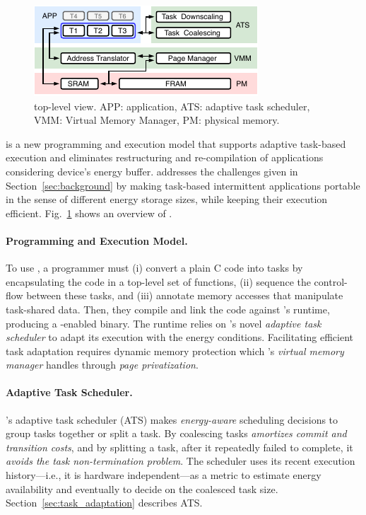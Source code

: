 \begin{figure}
	\centering
	\includegraphics[width=\columnwidth]{figures/system-overview.pdf}
	\caption{\sys top-level view. APP: application, ATS: adaptive task scheduler, VMM: Virtual Memory Manager, PM: physical memory.}
	\label{fig:system_overview}
\end{figure}

\sys is a new programming and execution model that supports adaptive task-based execution and eliminates restructuring and re-compilation of applications considering device's energy buffer. \sys addresses the challenges given in Section~\ref{sec:background} by making task-based intermittent applications portable in the sense of different energy storage sizes, while keeping their execution efficient. Fig.~\ref{fig:system_overview} shows an overview of \sys.

\paragraph{Programming and Execution Model.}
To use \sys, a programmer must (i) convert a plain C code into tasks by encapsulating the code in a top-level set of functions, (ii) sequence the control-flow between these tasks, and (iii) annotate memory accesses that manipulate task-shared data. Then, they compile and link the code against \sys's runtime, producing a \sys-enabled binary. The runtime relies on \sys's novel {\em adaptive task scheduler} to adapt its execution with the energy conditions. Facilitating efficient task adaptation requires dynamic memory protection which \sys's \emph{virtual memory manager} handles through \emph{page privatization}.

\paragraph{Adaptive Task Scheduler.}
\sys's adaptive task scheduler (ATS) makes \emph{energy-aware} scheduling decisions to group tasks together or split a task. By coalescing tasks \sys \emph{amortizes commit and transition costs}, and by splitting a task, after it repeatedly failed to complete, it \emph{avoids the task non-termination problem}. The scheduler uses its recent execution history---i.e., it is hardware independent---as a metric to estimate energy availability and eventually to decide on the coalesced task size. Section~\ref{sec:task_adaptation} describes ATS.


